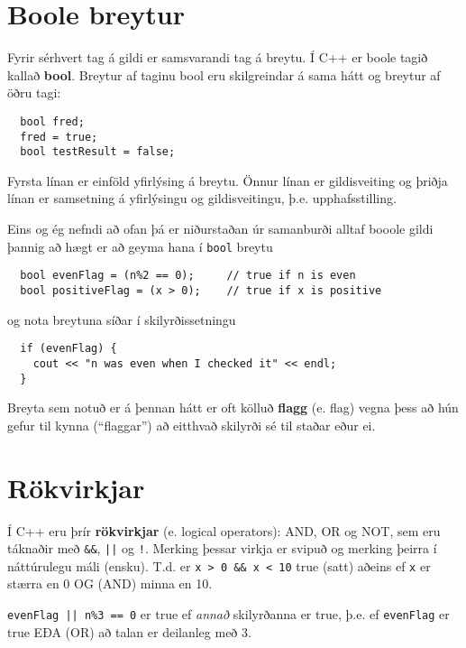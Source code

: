 \section{Boole breytur}

Fyrir sérhvert tag á gildi er samsvarandi tag á breytu.
Í C++ er boole tagið kallað {\bf bool}.
Breytur af taginu bool eru skilgreindar á sama hátt og breytur af öðru tagi:

\begin{verbatim}
  bool fred;
  fred = true;
  bool testResult = false;
\end{verbatim}
%
Fyrsta línan er einföld yfirlýsing á breytu.
Önnur línan er gildisveiting og þriðja línan er samsetning á yfirlýsingu og gildisveitingu, þ.e. upphafsstilling.


Eins og ég nefndi að ofan þá er niðurstaðan úr samanburði alltaf booole gildi þannig að hægt er að geyma hana í {\tt bool} breytu

\begin{verbatim}
  bool evenFlag = (n%2 == 0);     // true if n is even
  bool positiveFlag = (x > 0);    // true if x is positive
\end{verbatim}
%
og nota breytuna síðar í skilyrðissetningu 

\begin{verbatim}
  if (evenFlag) {
    cout << "n was even when I checked it" << endl;
  }
\end{verbatim}
%
Breyta sem notuð er á þennan hátt er oft kölluð {\bf flagg} (e. flag)
vegna þess að hún gefur til kynna (``flaggar'') að eitthvað skilyrði sé til staðar eður ei.


\section{Rökvirkjar}

Í C++ eru þrír {\bf rökvirkjar} (e. logical operators): AND, OR og NOT,
sem eru táknaðir með {\tt \&\&}, {\tt ||} og {\tt !}.
Merking þessar virkja er svipuð og merking þeirra í náttúrulegu máli (ensku).
T.d. er {\tt x > 0 \&\& x < 10} true (satt) aðeins ef {\tt x} er stærra en 0 OG (AND) minna en 10.


{\tt evenFlag || n\%3 == 0} er true ef {\em annað} skilyrðanna er true, þ.e. ef {\tt evenFlag} er true EÐA (OR) að talan er deilanleg með 3.

